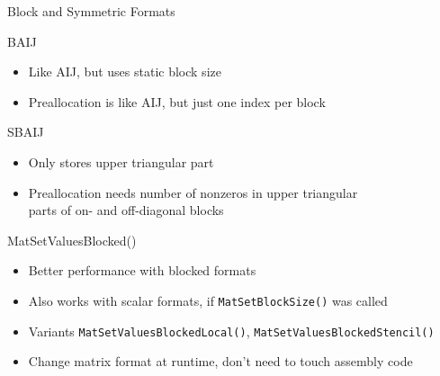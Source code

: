 \begin{frame}[fragile]{Block and Symmetric Formats}
  \begin{block}{BAIJ}
    \begin{itemize}
    \item Like AIJ, but uses static block size
    \item Preallocation is like AIJ, but just one index per block
    \end{itemize}
  \end{block}
  
  \begin{block}{SBAIJ}
    \begin{itemize}
    \item Only stores upper triangular part
    \item Preallocation needs number of nonzeros in upper triangular \\
      parts of on- and off-diagonal blocks
    \end{itemize}
  \end{block}
    
  \begin{block}{MatSetValuesBlocked()}
    \begin{itemize}
    \item Better performance with blocked formats
    \item Also works with scalar formats, if \lstinline|MatSetBlockSize()| was called
    \item Variants \lstinline|MatSetValuesBlockedLocal()|, \lstinline|MatSetValuesBlockedStencil()|
    \item Change matrix format at runtime, don't need to touch assembly code
    \end{itemize}
  \end{block}
\end{frame}
